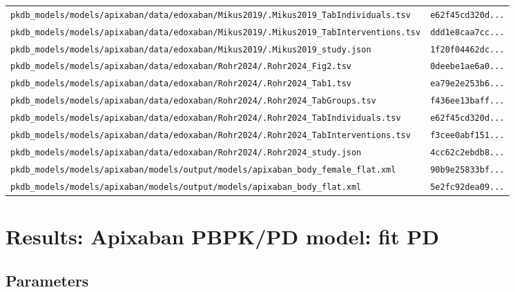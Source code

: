 \begin{longtable}{ll}
\texttt{pkdb\_models/models/apixaban/data/edoxaban/Mikus2019/.Mikus2019\_TabIndividuals.tsv} & \texttt{e62f45cd320d...} \\
\texttt{pkdb\_models/models/apixaban/data/edoxaban/Mikus2019/.Mikus2019\_TabInterventions.tsv} & \texttt{ddd1e8caa7cc...} \\
\texttt{pkdb\_models/models/apixaban/data/edoxaban/Mikus2019/.Mikus2019\_study.json} & \texttt{1f20f04462dc...} \\
\texttt{pkdb\_models/models/apixaban/data/edoxaban/Rohr2024/.Rohr2024\_Fig2.tsv} & \texttt{0deebe1ae6a0...} \\
\texttt{pkdb\_models/models/apixaban/data/edoxaban/Rohr2024/.Rohr2024\_Tab1.tsv} & \texttt{ea79e2e253b6...} \\
\texttt{pkdb\_models/models/apixaban/data/edoxaban/Rohr2024/.Rohr2024\_TabGroups.tsv} & \texttt{f436ee13baff...} \\
\texttt{pkdb\_models/models/apixaban/data/edoxaban/Rohr2024/.Rohr2024\_TabIndividuals.tsv} & \texttt{e62f45cd320d...} \\
\texttt{pkdb\_models/models/apixaban/data/edoxaban/Rohr2024/.Rohr2024\_TabInterventions.tsv} & \texttt{f3cee0abf151...} \\
\texttt{pkdb\_models/models/apixaban/data/edoxaban/Rohr2024/.Rohr2024\_study.json} & \texttt{4cc62c2ebdb8...} \\
\texttt{pkdb\_models/models/apixaban/models/output/models/apixaban\_body\_female\_flat.xml} & \texttt{90b9e25833bf...} \\
\texttt{pkdb\_models/models/apixaban/models/output/models/apixaban\_body\_flat.xml} & \texttt{5e2fc92dea09...} \\
\end{longtable}

\section{Results: Apixaban PBPK/PD model: fit PD}

\subsection{Parameters}

